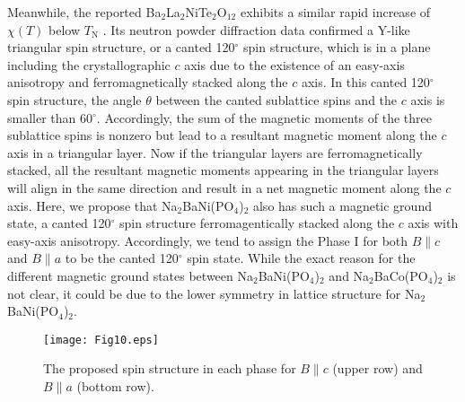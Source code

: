\documentclass[aps,twocolumn,superscriptaddress,showpacs]{revtex4-1}
\begin{document}
Meanwhile, the reported Ba$_2$La$_2$NiTe$_2$O$_{12}$ exhibits a similar rapid increase of $\chi(T)$ below $T_{\text{N}}$ \cite{PhysRevB.100.064417}. Its neutron powder diffraction data confirmed a Y-like triangular spin structure, or a canted 120$^\circ$ spin structure, which is in a plane including the crystallographic $c$ axis due to the existence of an easy-axis  anisotropy and ferromagnetically stacked along the $c$ axis. In this canted 120$^\circ$ spin structure, the angle $\theta$ between the canted sublattice spins and the $c$ axis is smaller than 60$^\circ$. Accordingly, the sum of the magnetic moments of the three sublattice spins is nonzero but lead to a resultant magnetic moment along the $c$ axis in a triangular layer. Now if the triangular layers are ferromagnetically stacked, all the resultant magnetic moments appearing in the triangular layers will align in the same direction and result in a net magnetic moment along the $c$ axis. Here, we propose that Na$_2$BaNi(PO$_4$)$_2$ also has such a magnetic ground state, a canted 120$^\circ$ spin structure ferromagentically stacked along the $c$ axis with easy-axis anisotropy. Accordingly, we tend to assign the Phase I for both $B \parallel c$ and $B \parallel a$ to be the canted 120$^\circ$ spin state. While the exact reason for the different magnetic ground states between Na$_2$BaNi(PO$_4$)$_2$ and Na$_2$BaCo(PO$_4$)$_2$ is not clear, it could be due to the lower symmetry in lattice structure for Na$_2$BaNi(PO$_4$)$_2$.

\begin{figure}
\texttt{[image: Fig10.eps]}
\caption{The proposed spin structure in each phase for $B \parallel c$ (upper row) and $B \parallel a$ (bottom row).}
\label{kappaH}
\end{figure}
\end{document}
